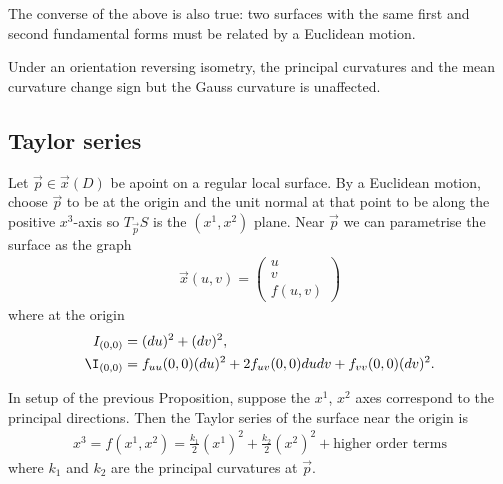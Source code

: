 \documentclass{article}
\begin{document}
\begin{theorem}
    The converse of the above is also true: two surfaces with the same first and second 
    fundamental forms must be related by a Euclidean motion.
\end{theorem}

\begin{proposition}[Notes 9.9]
    Under an orientation reversing isometry, the principal curvatures and the mean curvature 
    change sign but the Gauss curvature is unaffected. 
\end{proposition}

\subsection{Taylor series}

\begin{proposition}[Notes 9.10]
    Let $\vec p \in \vec x(D)$ be apoint on a regular local surface. By a Euclidean motion,
    choose $\vec p$ to be at the origin and the unit normal at that point to be along the positive
    $x^3$-axis so $T_{\vec p}S$ is the $(x^1,x^2)$ plane. Near $\vec p$ we can parametrise 
    the surface as the graph 
    \begin{align*}
        \vec x(u,v)=\begin{pmatrix}
            u \\ v \\ f(u,v)
        \end{pmatrix}
    \end{align*}
    where at the origin
    \begin{align*}
        I_{(0,0)}&=(du)^2+(dv)^2,\\
        \I_{(0,0)}&=f_{uu}(0,0)(du)^2+2f_{uv}(0,0)dudv+f_{vv}(0,0)(dv)^2.
    \end{align*}
\end{proposition}

\begin{proposition}[Notes 9.11]
    In setup of the previous Proposition, suppose the $x^1$, $x^2$ axes correspond 
    to the principal directions. Then the Taylor series of the surface near the origin
    is 
    \begin{align*}
        x^3 = f(x^1, x^2) = \frac{k_1}{2}(x^1)^2 + \frac{k_2}{2}(x^2)^2 + \text{higher order terms}
    \end{align*}
    where $k_1$ and $k_2$ are the principal curvatures at $\vec p$.
\end{proposition}
\end{document}

